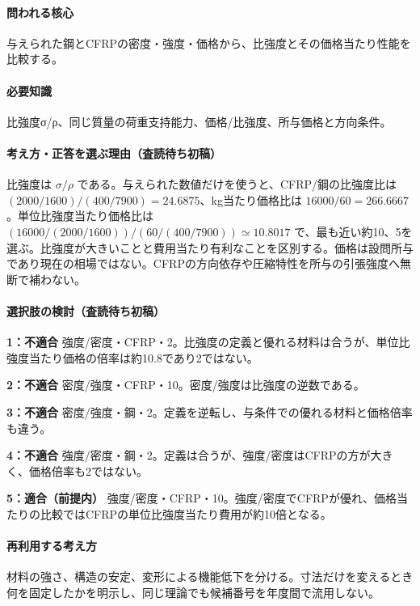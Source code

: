 \paragraph{問われる核心} 与えられた鋼とCFRPの密度・強度・価格から、比強度とその価格当たり性能を比較する。

\paragraph{必要知識} 比強度σ/ρ、同じ質量の荷重支持能力、価格/比強度、所与価格と方向条件。

\paragraph{考え方・正答を選ぶ理由（査読待ち初稿）} 比強度は \(\sigma/\rho\) である。与えられた数値だけを使うと、CFRP/鋼の比強度比は \((2000/1600)/(400/7900)=24.6875\)、kg当たり価格比は \(16000/60=266.6667\)。単位比強度当たり価格比は \((16000/(2000/1600))/(60/(400/7900))\simeq10.8017\) で、最も近い約10、5を選ぶ。比強度が大きいことと費用当たり有利なことを区別する。価格は設問所与であり現在の相場ではない。CFRPの方向依存や圧縮特性を所与の引張強度へ無断で補わない。

\paragraph{選択肢の検討（査読待ち初稿）}\mbox{}\par

\noindent\textbf{1：不適合} 強度/密度・CFRP・2。比強度の定義と優れる材料は合うが、単位比強度当たり価格の倍率は約10.8であり2ではない。\par

\noindent\textbf{2：不適合} 密度/強度・CFRP・10。密度/強度は比強度の逆数である。\par

\noindent\textbf{3：不適合} 密度/強度・鋼・2。定義を逆転し、与条件での優れる材料と価格倍率も違う。\par

\noindent\textbf{4：不適合} 強度/密度・鋼・2。定義は合うが、強度/密度はCFRPの方が大きく、価格倍率も2ではない。\par

\noindent\textbf{5：適合（前提内）} 強度/密度・CFRP・10。強度/密度でCFRPが優れ、価格当たりの比較ではCFRPの単位比強度当たり費用が約10倍となる。\par

\paragraph{再利用する考え方} 材料の強さ、構造の安定、変形による機能低下を分ける。寸法だけを変えるとき何を固定したかを明示し、同じ理論でも候補番号を年度間で流用しない。

